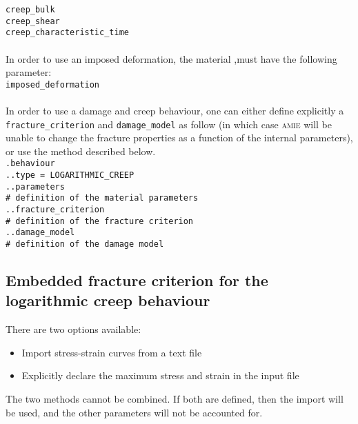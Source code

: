 \documentclass[10pt]{article}
\begin{document}
\noindent \verb+creep_bulk+\\
\verb+creep_shear+\\
\verb+creep_characteristic_time+

\paragraph{} In order to use an imposed deformation, the material ,must have the following parameter:\\

\noindent \verb+imposed_deformation+

\paragraph{} In order to use a damage and creep behaviour, one can either define explicitly a \verb+fracture_criterion+ and \verb+damage_model+ as follow (in which case \textsc{amie} will be unable to change the fracture properties as a function of the internal parameters), or use the method described below.\\

\noindent \verb+.behaviour+\\
\verb+..type = LOGARITHMIC_CREEP+\\
\verb+..parameters+\\
\verb+# definition of the material parameters+\\
\verb+..fracture_criterion+\\
\verb+# definition of the fracture criterion+\\
\verb+..damage_model+\\
\verb+# definition of the damage model+

\subsection{Embedded fracture criterion for the logarithmic creep behaviour}

There are two options available:

\begin{itemize}
	\item Import stress-strain curves from a text file
	\item Explicitly declare the maximum stress and strain in the input file
\end{itemize}

The two methods cannot be combined. If both are defined, then the import will be used, and the other parameters will not be accounted for.
\end{document}
